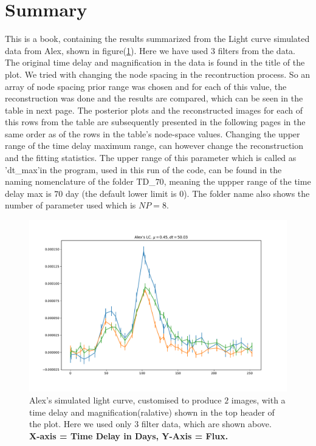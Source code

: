 \documentclass{article}
\begin{document}
\section*{Summary}
This is a book, containing the results summarized from the Light curve simulated data from Alex, shown in figure(\ref{A}). Here we have used $3$ filters from the data. The original time delay and magnification in the data is found in the title of the plot. We tried with changing the node spacing in the recontruction process. So an array of node spacing prior range was chosen and for each of this value, the reconstruction was done and the results are compared, which can be seen in the table in next page. The posterior plots and the reconstructed images for each of this rows from the table are subsequently presented in the following pages in the same order as of the rows in the table's node-space values.
Changing the upper range of the time delay maximum range, can however change the reconstruction and the fitting statistics. The upper range of this parameter which is called as 'dt\_max'in the program, used in this run of the code, can be found in the naming nomenclature of the folder TD\_$70$, meaning the uppper range of the time delay max is $70$ day (the default lower limit is $0$). The folder name also shows the number of parameter used which is $NP=8$. 
  

\begin{figure}[h!]
  \centering
    \includegraphics[width=\textwidth]{Alex_LC.pdf}
  \caption{Alex's simulated light curve, customised to produce $2$ images, with a time delay and magnification(ralative) shown in the top header of the plot. Here we used only $3$ filter data, which are shown above.\\\hspace{\textwidth}\textbf{X-axis = Time Delay in Days, Y-Axis = Flux.}}
  \label{A}
\end{figure}
\end{document}
